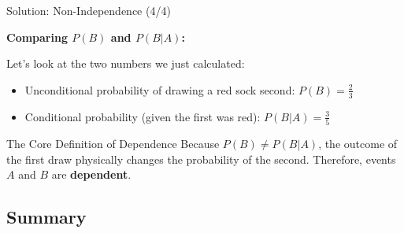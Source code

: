 \begin{frame}{Solution: Non-Independence (4/4)}
    \begin{solution}
        \textbf{Comparing $P(B)$ and $P(B|A)$:}
        
        Let's look at the two numbers we just calculated:
        \begin{itemize}
            \item Unconditional probability of drawing a red sock second: $P(B) = \frac{2}{3}$
            \item Conditional probability (given the first was red): $P(B|A) = \frac{3}{5}$
        \end{itemize}

        \pause \vspace{0.4cm}
        
        \begin{alertblock}{The Core Definition of Dependence}
            Because $P(B) \neq P(B|A)$, the outcome of the first draw physically changes the probability of the second. Therefore, events $A$ and $B$ are \textbf{dependent}.
        \end{alertblock}

    \end{solution}
\end{frame}

\subsection{Summary}


